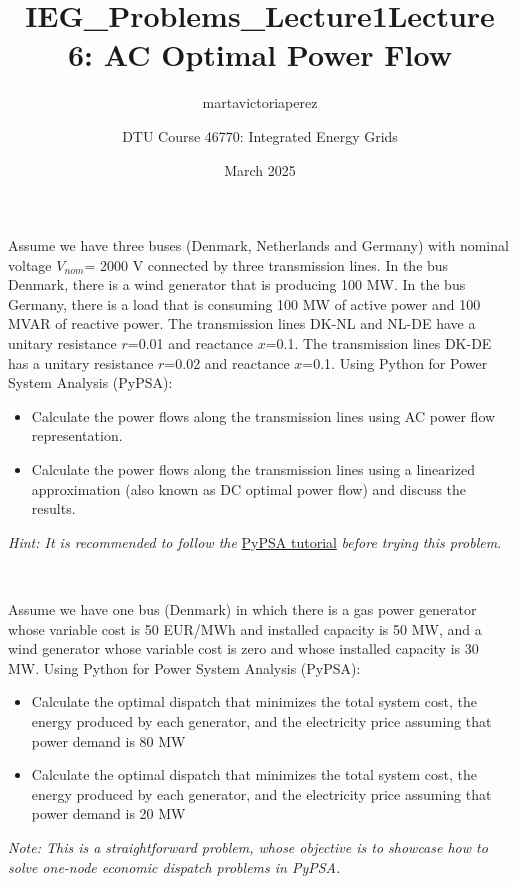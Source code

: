 \documentclass[10pt]{article}
\title{IEG_Problems_Lecture1}
\author{martavictoriaperez }
\date{March 2025}
\newenvironment{problem}[2][Problem]{\begin{trivlist}
\item[\hskip \labelsep {\bfseries #1}\hskip \labelsep {\bfseries #2.}]}{\end{trivlist}}
\begin{document}
 
\title{\textbf{Lecture 6: AC Optimal Power Flow}}
\author{
DTU Course 46770: Integrated Energy Grids }
\maketitle
\begin{problem}{6.1}
Assume we have three buses (Denmark, Netherlands and Germany) with nominal voltage $V_{nom}$= 2000 V connected by three transmission lines. In the bus Denmark, there is a wind generator that is producing 100 MW. In the bus Germany, there is a load that is consuming 100 MW of active power and 100 MVAR of reactive power. The transmission lines DK-NL and NL-DE have a unitary resistance $r$=0.01 and reactance $x$=0.1. The transmission lines DK-DE has a unitary resistance $r$=0.02 and reactance $x$=0.1. Using Python for Power System Analysis (PyPSA):

\begin{itemize}
\item[a)] Calculate the power flows along the transmission lines using AC power flow representation.

\item[b)]  Calculate the power flows along the transmission lines using a linearized approximation (also known as DC optimal power flow) and discuss the results.
\end{itemize}

\textit{Hint: It is recommended to follow the} \href{https://aleks-g.github.io/integrated-energy-grids/intro-pypsa.html#}{PyPSA tutorial} \textit{before trying this problem.}

\end{problem}

\

\begin{problem}{6.2}

Assume we have one bus (Denmark) in which there is a gas power generator whose variable cost is 50 EUR/MWh and installed capacity is 50 MW, and a wind generator whose variable cost is zero and whose installed capacity is 30 MW. Using Python for Power System Analysis (PyPSA):

\begin{itemize}
\item[a)] Calculate the optimal dispatch that minimizes the total system cost, the energy produced by each generator, and the electricity price assuming that power demand is 80 MW

\item[b)]  Calculate the optimal dispatch that minimizes the total system cost, the energy produced by each generator, and the electricity price assuming that power demand is 20 MW
\end{itemize}

\textit{Note: This is a straightforward problem, whose objective is to showcase how to solve one-node economic dispatch problems in PyPSA.}

\end{problem}
\end{document}
